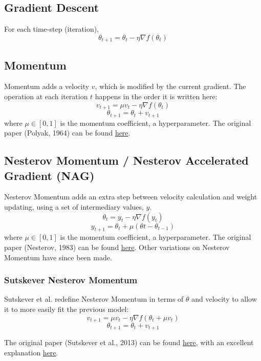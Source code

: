 \documentclass[fleqn]{article}
\begin{document}
\subsection{Gradient Descent}
For each time-step (iteration),
\[ \theta_{t+1} = \theta_t - \eta \nabla f(\theta_t) \]

\subsection{Momentum}
Momentum adds a velocity $v$, which is modified by the current gradient.
The operation at each iteration $t$ happens in the order it is written
here:
\[ v_{t+1} = \mu v_t - \eta \nabla f(\theta_t) \]
\[ \theta_{t+1} = \theta_t + v_{t+1} \]
where $\mu \in [0, 1]$ is the momentum coefficient, a hyperparameter. The
original paper (Polyak, 1964) can be found 
\href{https://www.researchgate.net/publication/243648538_Some_methods_of_speeding_up_the_convergence_of_iteration_methods}
{here}.

\subsection{Nesterov Momentum / Nesterov Accelerated\\Gradient (NAG)}
Nesterov Momentum adds an extra step between velocity calculation and
weight updating, using a set of intermediary values, $y$.
\[ \theta_{t} = y_t - \eta \nabla f (y_t) \]
\[ y_{t+1} = \theta_{t} + \mu(\theta{t} - \theta_{t-1}) \]
where $\mu \in [0, 1]$ is the momentum coefficient, a hyperparameter. The
original paper (Nesterov, 1983) can be found
\href{http://www.cis.pku.edu.cn/faculty/vision/zlin/1983-A%20Method%20of%20Solving%20a%20Convex%20Programming%20Problem%20with%20Convergence%20Rate%20O(k%5E(-2))_Nesterov.pdf}
{here}. Other variations on Nesterov Momentum have since been made.

\subsubsection{Sutskever Nesterov Momentum}
Sutskever et al. redefine Nesterov Momentum in terms of $\theta$ and
velocity to allow it to more easily fit the previous model:
\[ v_{t+1} = \mu v_t - \eta \nabla f(\theta_t + \mu v_t) \]
\[ \theta_{t+1} = \theta_t + v_{t+1} \]


The original paper (Sutskever et al., 2013) can be found
\href{http://www.cs.toronto.edu/~fritz/absps/momentum.pdf}{here},
with an excellent explanation
\href{https://jlmelville.github.io/mize/nesterov.html#sutskever_nesterov_momentum}
{here}.
\end{document}
